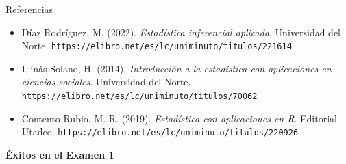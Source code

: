 \documentclass[aspectratio=169,10pt]{beamer}
\begin{document}
\begin{frame}{Referencias}
  \footnotesize
  \begin{itemize}
    \item[{[1]}] Díaz Rodríguez, M. (2022). \textit{Estadística inferencial
      aplicada}. Universidad del Norte.
      \texttt{https://elibro.net/es/lc/uniminuto/titulos/221614}
    \item[{[2]}] Llinás Solano, H. (2014). \textit{Introducción a la
      estadística con aplicaciones en ciencias sociales}. Universidad del
      Norte. \texttt{https://elibro.net/es/lc/uniminuto/titulos/70062}
    \item[{[3]}] Contento Rubio, M. R. (2019). \textit{Estadística con
      aplicaciones en R}. Editorial Utadeo.
      \texttt{https://elibro.net/es/lc/uniminuto/titulos/220926}
  \end{itemize}

  \vspace{0.3cm}
  \begin{center}
    {\Large\color{uniAzul}\textbf{Éxitos en el Examen 1}}
  \end{center}
\end{frame}
\end{document}

